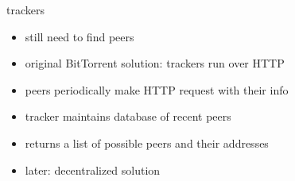 \begin{frame}{trackers}
    \begin{itemize}
    \item still need to find peers
    \vspace{.5cm}
    \item original BitTorrent solution: trackers run over HTTP
    \item peers periodically make HTTP request with their info
    \item tracker maintains database of recent peers
    \item returns a list of possible peers and their addresses
    \vspace{.5cm}
    \item later: decentralized solution
    \end{itemize}
\end{frame}
